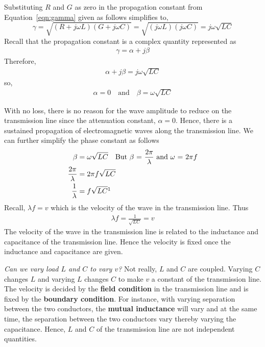 Substituting $R$ and $G$ as zero in the propagation constant from Equation~\eqref{eqn:gamma} given as follows simplifies to,
\begin{dmath*}
\gamma = \sqrt{(R + j\omega L)(G + j\omega C)}
= \sqrt{(j\omega L)(j\omega C)}
= j\omega\sqrt{LC}
\end{dmath*}
Recall that the propagation constant is a complex quantity represented as
\begin{align*}
\gamma = \alpha + j\beta
\end{align*} 
Therefore,
\begin{align*}
\alpha + j\beta = j\omega\sqrt{LC}
\end{align*}
so,
\begin{align*}
\alpha = 0\quad\text{and}\quad\beta = \omega\sqrt{LC}
\end{align*}

With no loss, there is no reason for the wave amplitude to reduce on the transmission line since the attenuation constant, $\alpha = 0$. Hence, there is a sustained propagation of electromagnetic waves along the transmission line. We can further simplify the phase constant as follows
\begin{align*}
\beta &= \omega\sqrt{LC}\quad\text{But }\beta\text{ = }\frac{2\pi}{\lambda}\text{ and }\omega\text{ = }2\pi f\\
\frac{2\pi}{\lambda} &= 2\pi f\sqrt{LC}\\
\frac{1}{\lambda} &= f\sqrt{LC}\footnotemark
\end{align*}
Recall, $\lambda f = v$ which is the velocity of the wave in the transmission line. Thus
\begin{align*}
\lambda f = \frac{1}{\sqrt{LC}} = v
\end{align*}
The velocity of the wave in the transmission line is related to the inductance and capacitance of the transmission line. Hence the velocity is fixed once the inductance and capacitance are given.

\emph{Can we vary load $L$ and $C$ to vary $v$?} Not really, $L$ and $C$ are coupled. Varying $C$ changes $L$ and varying $L$ changes $C$ to make $v$ a constant of the transmission line. The velocity is decided by the \textbf{field condition} in the transmission line and is fixed by the \textbf{boundary condition}. For instance, with varying separation between the two conductors, the \textbf{mutual inductance} will vary and at the same time, the separation between the two conductors vary thereby varying the capacitance. Hence, $L$ and $C$ of the transmission line are not independent quantities.

